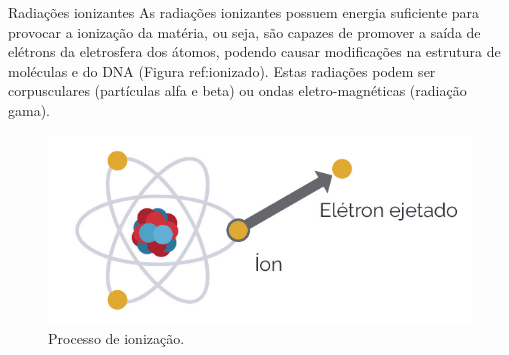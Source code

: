 \documentclass[presentation,professionalfonts,aspectratio=169]{beamer}
\begin{document}
\begin{frame}[label={sec:org2d3a174}]{Radiações ionizantes}
As radiações ionizantes possuem energia suficiente para provocar a ionização da matéria, ou seja, são capazes de promover a saída de elétrons da eletrosfera dos átomos, podendo causar modificações na estrutura de moléculas e do DNA (Figura ref:ionizado). Estas radiações podem ser corpusculares (partículas alfa e beta) ou ondas eletro-magnéticas (radiação gama).

\begin{figure}[htbp]
\centering
\includegraphics[scale=0.3]{FQ/Radioatividade/ionizado.png}
\caption{\label{fig:orgc8f169a}Processo de ionização.}
\end{figure}
\end{frame}
\end{document}
